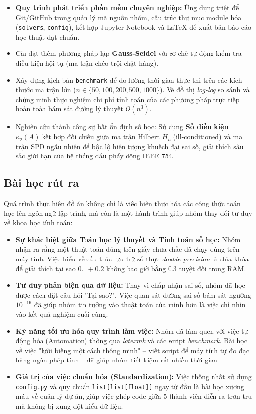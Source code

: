 \begin{itemize}[itemsep=0.15cm, topsep=0.1cm]
    \item \textbf{Quy trình phát triển phần mềm chuyên nghiệp:} Ứng dụng triệt để Git/GitHub trong quản lý mã nguồn nhóm, cấu trúc thư mục module hóa (\texttt{solvers}, \texttt{config}), kết hợp Jupyter Notebook và \LaTeX{} để xuất bản báo cáo học thuật đạt chuẩn.

    \item Cài đặt thêm phương pháp lặp \textbf{Gauss-Seidel} với cơ chế tự động kiểm tra điều kiện hội tụ (ma trận chéo trội chặt hàng).
    
    \item Xây dựng kịch bản \texttt{benchmark} để đo lường thời gian thực thi trên các kích thước ma trận lớn ($n \in \{50, 100, 200, 500, 1000\}$). Vẽ đồ thị \textit{log-log} so sánh và chứng minh thực nghiệm chi phí tính toán của các phương pháp trực tiếp hoàn toàn bám sát đường lý thuyết $O(n^3)$.

    \item Nghiên cứu thành công sự bất ổn định số học: Sử dụng \textbf{Số điều kiện $\kappa_2(A)$} kết hợp đối chiếu giữa ma trận Hilbert $H_n$ (ill-conditioned) và ma trận SPD ngẫu nhiên để bộc lộ hiện tượng khuếch đại sai số, giải thích sâu sắc giới hạn của hệ thống dấu phẩy động IEEE 754.
\end{itemize}

\subsection{Bài học rút ra}
Quá trình thực hiện đồ án không chỉ là việc hiện thực hóa các công thức toán học lên ngôn ngữ lập trình, mà còn là một hành trình giúp nhóm thay đổi tư duy về khoa học tính toán:

\begin{itemize}[itemsep=0.15cm]
    \item \textbf{Sự khác biệt giữa Toán học lý thuyết và Tính toán số học:} Nhóm nhận ra rằng một thuật toán đúng trên giấy chưa chắc đã chạy đúng trên máy tính. Việc hiểu về cấu trúc lưu trữ số thực \textit{double precision} là chìa khóa để giải thích tại sao $0.1 + 0.2$ không bao giờ bằng $0.3$ tuyệt đối trong RAM.
    \item \textbf{Tư duy phản biện qua dữ liệu:} Thay vì chấp nhận sai số, nhóm đã học được cách đặt câu hỏi "Tại sao?". Việc quan sát đường sai số bám sát ngưỡng $10^{-16}$ đã giúp nhóm tin tưởng vào thuật toán của mình hơn là việc chỉ nhìn vào kết quả nghiệm cuối cùng.
    \item \textbf{Kỹ năng tối ưu hóa quy trình làm việc:} Nhóm đã làm quen với việc tự động hóa (Automation) thông qua \textit{latexmk} và các script \textit{benchmark}. Bài học về việc "lười biếng một cách thông minh" – viết script để máy tính tự đo đạc hàng ngàn phép tính – đã giúp nhóm tiết kiệm rất nhiều thời gian.
    \item \textbf{Giá trị của việc chuẩn hóa (Standardization):} Việc thống nhất sử dụng \texttt{config.py} và quy chuẩn \texttt{list[list[float]]} ngay từ đầu là bài học xương máu về quản lý dự án, giúp việc ghép code giữa 5 thành viên diễn ra trơn tru mà không bị xung đột kiểu dữ liệu.
\end{itemize}

